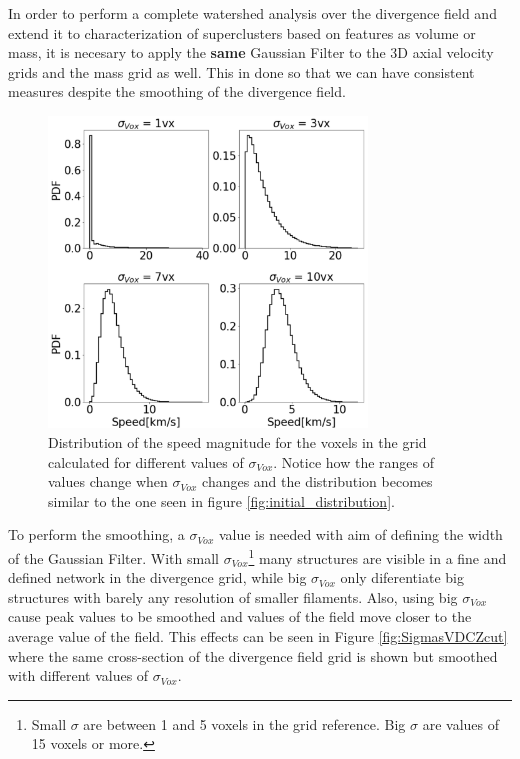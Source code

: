\documentclass[usenatbib]{mnras}
\begin{document}
In order to perform a complete watershed analysis over the divergence field and extend it to characterization of superclusters based on features as volume or mass,  it is necesary to apply the  \textbf{same} Gaussian Filter to the 3D axial velocity grids and the mass grid as well. This in done so that we can have consistent measures despite the smoothing of the divergence field.



\begin{figure}
    \centering
    \includegraphics[width=240pt]{smooth_vel_dist.pdf}
    \caption{Distribution of the speed magnitude for the voxels in the grid calculated for different values of $\sigma_{Vox}$. Notice how the ranges of values change when $\sigma_{Vox}$ changes and the distribution becomes similar to the one seen in figure \ref{fig:initial_distribution}.}
    \label{fig:MD_Varios}
\end{figure}

To perform the smoothing, a $\sigma_{Vox}$ value is needed with aim of defining the width of the Gaussian Filter. With small $\sigma_{Vox}$\footnote{Small $\sigma$ are between 1 and 5 voxels in the grid reference. Big $\sigma$ are values of 15 voxels or more.} many structures are visible in a fine and defined network in the divergence grid, while big $\sigma_{Vox}$ only diferentiate big structures with barely any resolution of smaller filaments. Also, using big $\sigma_{Vox}$ cause peak values to be smoothed and values of the field move closer to  the average value of the field. This effects can be seen in Figure \ref{fig:SigmasVDCZcut} where the same cross-section of the divergence field grid is shown but smoothed with different values of $\sigma_{Vox}$.
\end{document}
